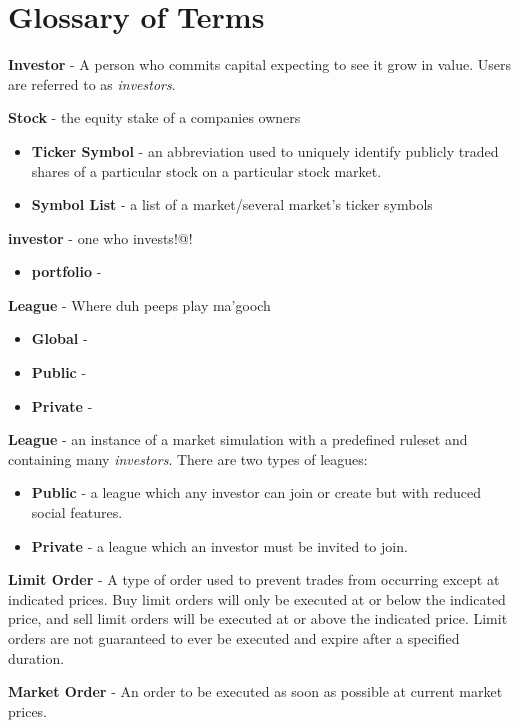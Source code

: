 \section{Glossary of Terms}

{
\raggedright
\textbf{Investor} - A person who commits capital expecting to see it grow in value. Users are referred 
to as \emph{investors}.

\textbf{Stock} - the equity stake of a companies owners
\begin{itemize}
\item \textbf{Ticker Symbol} - an abbreviation used to uniquely identify publicly traded shares of a particular stock on a particular stock market.
\item \textbf{Symbol List} - a list of a market/several market's ticker symbols
\end{itemize}

\textbf{investor} - one who invests!@!
\begin{itemize}
\item \textbf{portfolio} - 
\end{itemize}

\textbf{League} - Where duh peeps play ma'gooch
\begin{itemize}
\item \textbf{Global} -
\item \textbf{Public} -
\item \textbf{Private} -
\end{itemize}
\textbf{League} - an instance of a market simulation with a predefined ruleset and containing many 
\emph{investors}. There are two types of leagues:

\begin{itemize}
\item \textbf{ Public} - a league which any investor can join or create but with reduced
social features.
\item \textbf{ Private} - a league which an investor must be invited to join.
\end{itemize}

\textbf{Limit Order} - A type of order used to prevent trades from occurring except at indicated
prices. Buy limit orders will only be executed at or below the indicated price, and sell limit
orders will be executed at or above the indicated price. Limit orders are not guaranteed to ever
be executed and expire after a specified duration.

\textbf{Market Order} - An order to be executed as soon as possible at current market prices.

}
